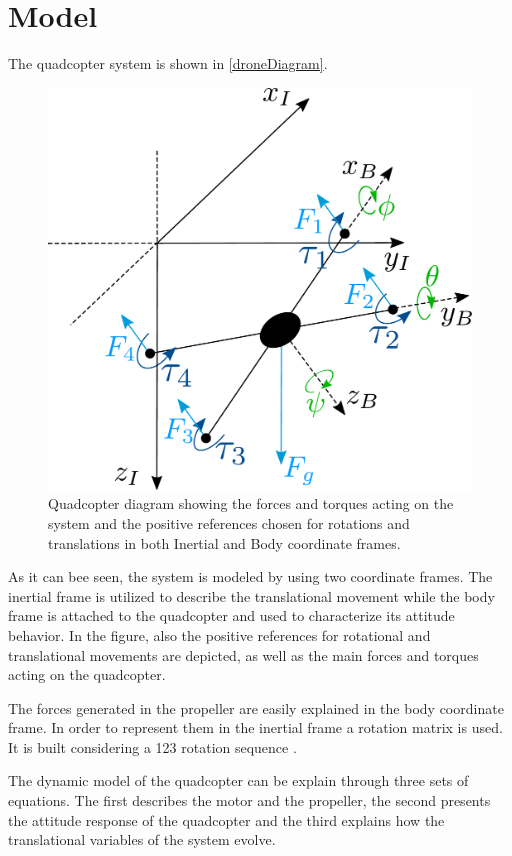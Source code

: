 \section{Model}
The quadcopter system is shown in \autoref{droneDiagram}. 
\begin{figure}[H]
	\centering
	\includegraphics[scale=0.25]{figures/droneDiagram}
	\caption{Quadcopter diagram showing the forces and torques acting on the system and the positive references chosen for rotations and translations in both Inertial and Body coordinate frames.}
	\label{droneDiagram}
\end{figure}
%
As it can bee seen, the system is modeled by using two coordinate frames. The inertial frame is utilized to describe the translational movement while the body frame is attached to the quadcopter and used to characterize its attitude behavior. In the figure, also the positive references for rotational and translational movements are depicted, as well as the main forces and torques acting on the quadcopter. 

The forces generated in the propeller are easily explained in the body coordinate frame. In order to represent them in the inertial frame a rotation matrix is used. It is built considering a 123 rotation sequence \cite{rotationmatrix}.
 
The dynamic model of the quadcopter can be explain through three sets of equations. The first describes the motor and the propeller, the second presents the attitude response of the quadcopter and the third explains how the translational variables of the system evolve.

